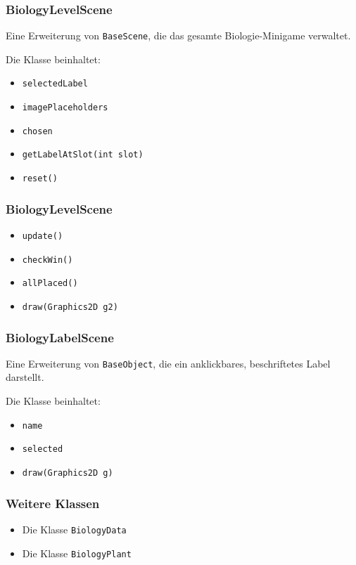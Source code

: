 \begin{frame}
	\frametitle{BiologyLevelScene}
	Eine Erweiterung von \texttt{BaseScene}, die das gesamte Biologie-Minigame verwaltet.

	Die Klasse beinhaltet:
		\begin{itemize}
			\item \texttt{selectedLabel}
			\item \texttt{imagePlaceholders}
			\item \texttt{chosen}
			\item \texttt{getLabelAtSlot(int slot)}
			\item \texttt{reset()}
		\end{itemize}
\end{frame}

\begin{frame}
	\frametitle{BiologyLevelScene}
	\begin{itemize}
		\item \texttt{update()}
		\item \texttt{checkWin()}
		\item \texttt{allPlaced()}
		\item \texttt{draw(Graphics2D g2)}
	\end{itemize}
\end{frame}

\begin{frame}
	\frametitle{BiologyLabelScene}
Eine Erweiterung von \texttt{BaseObject}, die ein anklickbares, beschriftetes Label darstellt.

Die Klasse beinhaltet:
	\begin{itemize}
		\item \texttt{name}
		\item \texttt{selected}
		\item \texttt{draw(Graphics2D g)}
	\end{itemize}
\end{frame}

\begin{frame}
	\frametitle{Weitere Klassen}
	\begin{itemize}
    \item Die Klasse \texttt{BiologyData}
	\item Die Klasse \texttt{BiologyPlant}
	\end{itemize}
\end{frame}
